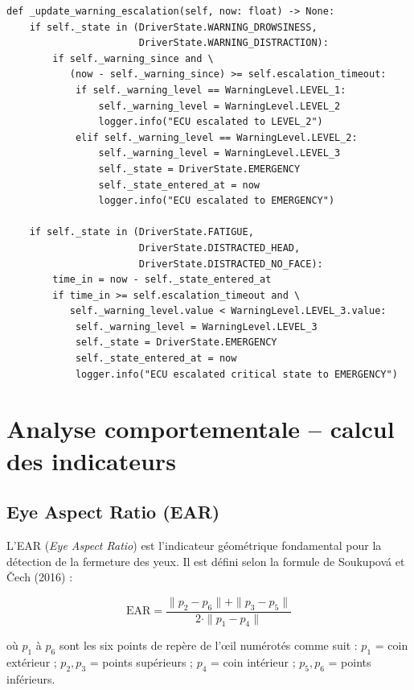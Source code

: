 \documentclass[12pt,a4paper]{report}
\begin{document}
\begin{lstlisting}[style=python, caption={Escalade des alertes (ecu\_decision.py)}, label=lst:escalade]
def _update_warning_escalation(self, now: float) -> None:
    if self._state in (DriverState.WARNING_DROWSINESS,
                       DriverState.WARNING_DISTRACTION):
        if self._warning_since and \
           (now - self._warning_since) >= self.escalation_timeout:
            if self._warning_level == WarningLevel.LEVEL_1:
                self._warning_level = WarningLevel.LEVEL_2
                logger.info("ECU escalated to LEVEL_2")
            elif self._warning_level == WarningLevel.LEVEL_2:
                self._warning_level = WarningLevel.LEVEL_3
                self._state = DriverState.EMERGENCY
                self._state_entered_at = now
                logger.info("ECU escalated to EMERGENCY")

    if self._state in (DriverState.FATIGUE,
                       DriverState.DISTRACTED_HEAD,
                       DriverState.DISTRACTED_NO_FACE):
        time_in = now - self._state_entered_at
        if time_in >= self.escalation_timeout and \
           self._warning_level.value < WarningLevel.LEVEL_3.value:
            self._warning_level = WarningLevel.LEVEL_3
            self._state = DriverState.EMERGENCY
            self._state_entered_at = now
            logger.info("ECU escalated critical state to EMERGENCY")
\end{lstlisting}

\section{Analyse comportementale -- calcul des indicateurs}

\subsection{Eye Aspect Ratio (EAR)}

L'EAR (\textit{Eye Aspect Ratio}) est l'indicateur g\'eom\'etrique fondamental pour la d\'etection de la fermeture des yeux. Il est d\'efini selon la formule de Soukupov\'a et \v{C}ech (2016) :

\begin{equation}
  \text{EAR} = \frac{\|p_2 - p_6\| + \|p_3 - p_5\|}{2 \cdot \|p_1 - p_4\|}
  \label{eq:ear}
\end{equation}

o\`u $p_1$ \`a $p_6$ sont les six points de rep\`ere de l'\oe il num\'erot\'es comme suit :
$p_1$ = coin ext\'erieur ; $p_2, p_3$ = points sup\'erieurs ; $p_4$ = coin int\'erieur ; $p_5, p_6$ = points inf\'erieurs.
\end{document}
